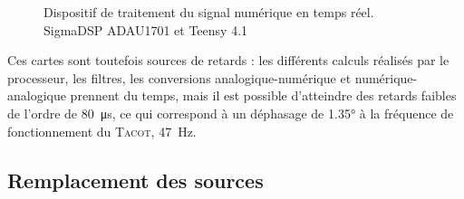 \begin{figure}[!ht]
    \centering
	\begin{subfigure}{.47\textwidth}
		\centering
		\caption{}
		\label{fig:ActiveControl_ADAU1701}
	\end{subfigure}		
	\begin{subfigure}{.47\textwidth}
		\centering
		\caption{}
		\label{fig:ActiveControl_Teensy41}
	\end{subfigure}	    
    \caption{Dispositif de traitement du signal numérique en temps réel.  SigmaDSP ADAU1701 et  Teensy 4.1}
    \label{fig:ActiveControl}
\end{figure}

Ces cartes sont toutefois sources de retards : les différents calculs réalisés par le processeur, les filtres, les conversions analogique-numérique et numérique-analogique prennent du temps, mais il est possible d'atteindre des retards faibles de l'ordre de \qty{80}{\micro\second}, ce qui correspond à un déphasage de \ang{1.35} à la fréquence de fonctionnement du \textsc{Tacot}, \qty{47}{\hertz}.
\subsection{Remplacement des sources}
